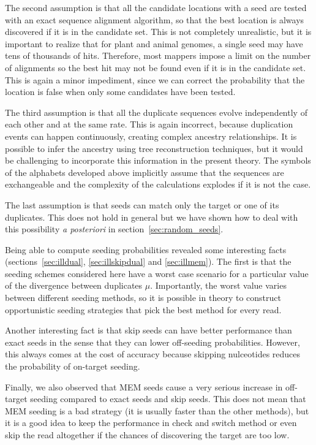 \documentclass{article}
\begin{document}
The second assumption is that all the candidate locations with a seed are
tested with an exact sequence alignment algorithm, so that the best
location is always discovered if it is in the candidate set. This is not
completely unrealistic, but it is important to realize that for plant and
animal genomes, a single seed may have tens of thousands of hits.
Therefore, most mappers impose a limit on the number of alignments so the
best hit may not be found even if it is in the candidate set. This is
again a minor impediment, since we can correct the probability that the
location is false when only some candidates have been tested.

The third assumption is that all the duplicate sequences evolve
independently of each other and at the same rate. This is again incorrect,
because duplication events can happen continuously, creating complex
ancestry relationships. It is possible to infer the ancestry using tree
reconstruction techniques, but it would be challenging to incorporate this
information in the present theory. The symbols of the alphabets developed
above implicitly assume that the sequences are exchangeable and the
complexity of the calculations explodes if it is not the case.

The last assumption is that seeds can match only the target or one of its
duplicates. This does not hold in general but we have shown how to deal
with this possibility \textit{a posteriori} in
section~\ref{sec:random_seeds}.

Being able to compute seeding probabilities revealed some interesting
facts (sections~\ref{sec:illdual}, \ref{sec:illskipdual} and
\ref{sec:illmem}). The first is that the seeding schemes considered here
have a worst case scenario for a particular value of the divergence
between duplicates $\mu$. Importantly, the worst value varies between
different seeding methods, so it is possible in theory to construct
opportunistic seeding strategies that pick the best method for every read.

Another interesting fact is that skip seeds can have better performance
than exact seeds in the sense that they can lower off-seeding
probabilities. However, this always comes at the cost of accuracy because
skipping nulceotides reduces the probability of on-target seeding.

Finally, we also observed that MEM seeds cause a very serious increase in
off-target seeding compared to exact seeds and skip seeds. This does not
mean that MEM seeding is a bad strategy (it is usually faster than the
other methods), but it is a good idea to keep the performance in check and
switch method or even skip the read altogether if the chances of
discovering the target are too low.
\end{document}

